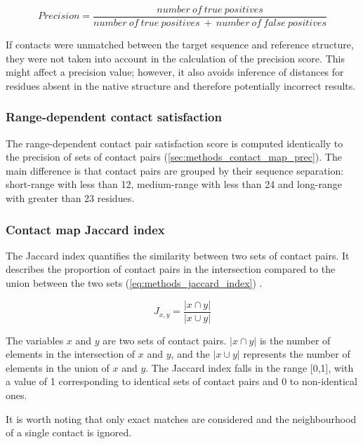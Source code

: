 \begin{equation} 
    Precision=\frac{number\ of\ true\ positives}{number\ of\ true\ positives\ +\ number\ of\ false\ positives}
    \label{eq:methods_contact_precision}
\end{equation}

If contacts were unmatched between the target sequence and reference structure, they were not taken into account in the calculation of the precision score. This might affect a precision value; however, it also avoids inference of distances for residues absent in the native structure and therefore potentially incorrect results.

\subsubsection{Range-dependent contact satisfaction} \label{sec:methods_longrange_satisfaction}
The range-dependent contact pair satisfaction score is computed identically to the precision of sets of contact pairs (\cref{sec:methods_contact_map_prec}). The main difference is that contact pairs are grouped by their sequence separation: short-range with less than 12, medium-range with less than 24 and long-range with greater than 23 residues.

\subsubsection{Contact map Jaccard index}
The Jaccard index quantifies the similarity between two sets of contact pairs. It describes the proportion of contact pairs in the intersection compared to the union between the two sets (\cref{eq:methods_jaccard_index}) \cite{Wuyun2018-hh}.

\begin{equation}
    J_{x,y}=\frac{\left |x \cap y\right |}{\left |x \cup y\right |}
    \label{eq:methods_jaccard_index}
\end{equation}

The variables $x$ and $y$ are two sets of contact pairs. $\left |x \cap y\right |$ is the number of elements in the intersection of $x$ and $y$, and the $\left |x \cup y\right |$ represents the number of elements in the union of $x$ and $y$. The Jaccard index falls in the range [0,1], with a value of 1 corresponding to identical sets of contact pairs and 0 to non-identical ones. 

It is worth noting that only exact matches are considered and the neighbourhood of a single contact is ignored.
